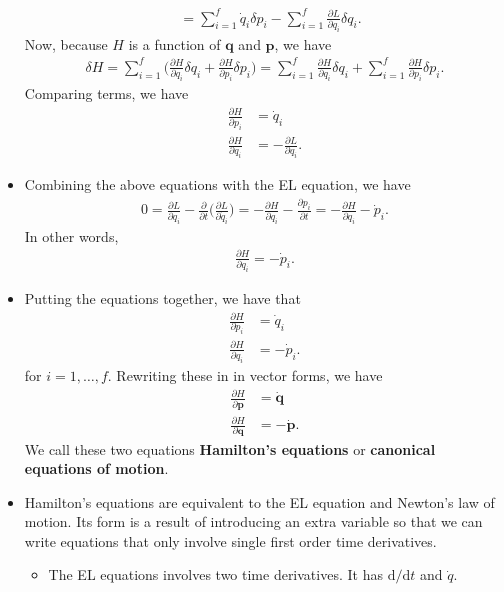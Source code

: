 \documentclass[10pt]{article}
\newcommand{\dee}{\mathrm{d}}
\newcommand{\ve}[1]{\mathbf{#1}}
\begin{document}
\begin{itemize}
\begin{align*}
      &= \sum_{i=1}^f \dot{q}_i \delta p_i       
      - \sum_{i=1}^f \frac{\partial L}{\partial q_i} \delta q_i.      
    \end{align*}
    Now, because $H$ is a function of $\ve{q}$ and $\ve{p}$, we have
    \begin{align*}      
      \delta H 
      = \sum_{i=1}^f \bigg( \frac{\partial H}{\partial q_i} \delta q_i + \frac{\partial H}{\partial p_i} \delta p_i \bigg)
      = \sum_{i=1}^f \frac{\partial H}{\partial q_i} \delta q_i + \sum_{i=1}^f \frac{\partial H}{\partial p_i} \delta p_i.
    \end{align*}
    Comparing terms, we have
    \begin{align*}
      \frac{\partial H}{\partial p_i} &= \dot{q}_i \\
      \frac{\partial H}{\partial q_i} &= -\frac{\partial L}{\partial q_i}.
    \end{align*}    

    \item Combining the above equations with the EL equation, we have
    \begin{align*}
      0 
      = \frac{\partial L}{\partial q_i} - \frac{\partial}{\partial t}\bigg( \frac{\partial L}{\partial \dot{q}_i} \bigg)
      = -\frac{\partial H}{\partial q_i} - \frac{\partial p_i}{\partial t} 
      = -\frac{\partial H}{\partial q_i} - \dot{p}_i.
    \end{align*}
    In other words,
    \begin{align*}
      \frac{\partial H}{\partial q_i} = -\dot{p}_i.
    \end{align*}

    \item Putting the equations together, we have that
    \begin{align*}
      \frac{\partial H}{\partial p_i} &= \dot{q}_i \\
      \frac{\partial H}{\partial q_i} &= -\dot{p}_i.
    \end{align*}
    for $i = 1, \dotsc, f$. Rewriting these in in vector forms, we have
    \begin{align*}
      \frac{\partial H}{\partial \ve{p}} &= \dot{\ve{q}} \\
      \frac{\partial H}{\partial \ve{q}} &= -\dot{\ve{p}}.
    \end{align*}
    We call these two equations {\bf Hamilton's equations} or {\bf canonical equations of motion}.

    \item Hamilton's equations are equivalent to the EL equation and Newton's law of motion. Its form is a result of introducing an extra variable so that we can write equations that only involve single first order time derivatives.
    \begin{itemize}
      \item The EL equations involves two time derivatives. It has $\dee / \dee t$ and $\dot{q}$.
    \end{itemize}


\end{itemize}
\end{document}

